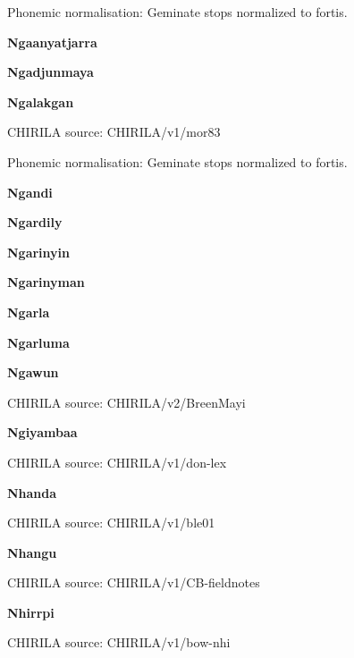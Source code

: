 Phonemic normalisation: Geminate stops normalized to fortis.

\textbf{Ngaanyatjarra}


\textbf{Ngadjunmaya}


\textbf{Ngalakgan}

CHIRILA source: CHIRILA/v1/mor83


Phonemic normalisation: Geminate stops normalized to fortis.

\textbf{Ngandi}


\textbf{Ngardily}


\textbf{Ngarinyin}


\textbf{Ngarinyman}


\newpage


\textbf{Ngarla}


\textbf{Ngarluma}


\textbf{Ngawun}

CHIRILA source: CHIRILA/v2/BreenMayi


\textbf{Ngiyambaa}

CHIRILA source: CHIRILA/v1/don-lex


\textbf{Nhanda}

CHIRILA source: CHIRILA/v1/ble01


\textbf{Nhangu}

CHIRILA source: CHIRILA/v1/CB-fieldnotes


\textbf{Nhirrpi}

CHIRILA source: CHIRILA/v1/bow-nhi


